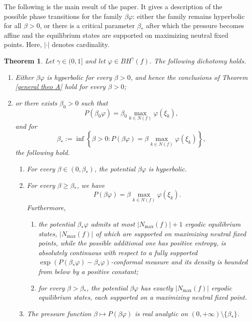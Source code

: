 \documentclass[10pt,a4paper]{amsart}
\numberwithin{equation}{section} %
\numberwithin{figure}{section} %
\newtheorem{theoalph}{Theorem}
\renewcommand{\=}{\coloneqq}
\newcommand{\Nmax}{N_\text{max}(f)}
\begin{document}
The following is the main result of the paper. It gives a description of the possible phase transitions for the family $\beta \varphi$: either the family remains hyperbolic for all $\beta>0$, or there is a critical parameter $\beta_{*}$ after which the pressure becomes affine and the equilibrium states are supported on maximizing neutral fixed points. Here, $|\cdot|$ denotes cardinality.


\begin{theoalph}\label{Theo A}
Let $\gamma\in(0,1]$ and let $\varphi\in BH^\gamma(f)$. The following dichotomy holds.
\begin{enumerate}
    \item[1.] Either $\beta\varphi$ is hyperbolic for every $\beta>0$, and hence the conclusions of Theorem \ref{general theo A} hold for every $\beta>0$;

    \item[2.] or there exists $\beta_0>0$ such that
    \[
    P(\beta_0\varphi)=\beta_0\max_{k\in N(f)}\varphi(\xi_k),
    \]
    and for
    \begin{equation}\label{eq 1 thm C}
        \beta_* := \inf\left\{\beta>0: P(\beta\varphi) = \beta\max_{k\in N(f)}\varphi(\xi_k)\right\},
    \end{equation}
    the following hold.
    \begin{enumerate}
        \item[(a)] For every $\beta\in(0,\beta_*)$, the potential $\beta\varphi$ is hyperbolic.

        \item[(b)] For every $\beta\geq \beta_*$, we have
        \begin{equation}\label{eq 2 thm 1}
            P(\beta\varphi)=\beta\max_{k\in N(f)}\varphi(\xi_k).
        \end{equation}
        Furthermore,
        \begin{enumerate}
            \item[(i)] the potential $\beta_*\varphi$ admits at most $|\Nmax|+1$ ergodic equilibrium states, $|\Nmax|$ of which are supported on maximizing neutral fixed points, while the possible additional one has positive entropy, is absolutely continuous with respect to a fully supported $\exp(P(\beta_*\varphi)-\beta_{*}\varphi)$-conformal measure and its density is bounded from below by a positive constant;

            \item[(ii)] for every $\beta>\beta_*$, the potential $\beta\varphi$ has exactly $|\Nmax|$ ergodic equilibrium states, each supported on a maximizing neutral fixed point.
        \end{enumerate}

        \item[(c)] The pressure function $\beta\mapsto P(\beta\varphi)$ is real analytic on $(0,+\infty)\setminus\{\beta_*\}$.
    \end{enumerate}
\end{enumerate}
\end{theoalph}
\end{document}
